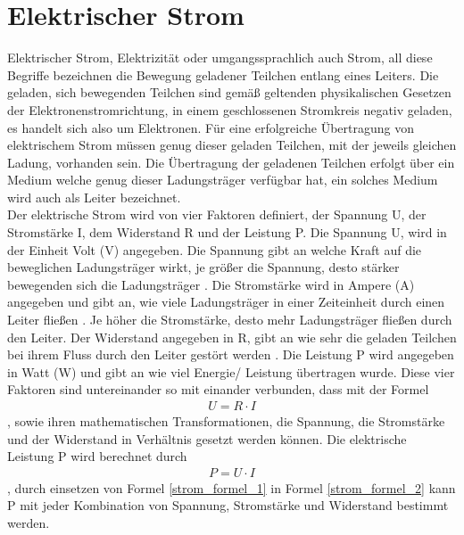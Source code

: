 \section{Elektrischer Strom}
Elektrischer Strom, Elektrizität oder umgangssprachlich auch Strom, all diese Begriffe bezeichnen die Bewegung geladener Teilchen entlang eines Leiters. Die geladen, sich bewegenden Teilchen sind gemäß geltenden physikalischen Gesetzen der Elektronenstromrichtung, in einem geschlossenen Stromkreis negativ geladen, es handelt sich also um Elektronen. Für eine erfolgreiche Übertragung von elektrischem Strom müssen genug dieser geladen Teilchen, mit der jeweils gleichen Ladung, vorhanden sein. Die Übertragung der geladenen Teilchen erfolgt über ein Medium welche genug dieser Ladungsträger verfügbar hat, ein solches Medium wird auch als Leiter bezeichnet.\\
Der elektrische Strom wird von vier Faktoren definiert, der Spannung U, der Stromstärke I, dem Widerstand R und der Leistung P. Die Spannung U, wird in der Einheit Volt (V) angegeben. Die Spannung gibt an welche Kraft auf die beweglichen Ladungsträger wirkt, je größer die Spannung, desto stärker bewegenden sich die Ladungsträger \cite{spannung_1}. Die Stromstärke wird in Ampere (A) angegeben und gibt an, wie viele Ladungsträger in einer Zeiteinheit durch einen Leiter fließen \cite{stromstaerke_1}. Je höher die Stromstärke, desto mehr Ladungsträger fließen durch den Leiter. Der Widerstand angegeben in R, gibt an wie sehr die geladen Teilchen bei ihrem Fluss durch den Leiter gestört werden \cite{widerstand_1}. Die Leistung P wird angegeben in Watt (W) und gibt an wie viel Energie/ Leistung übertragen wurde. Diese vier Faktoren sind untereinander so mit einander verbunden, dass mit der Formel 
\begin{align}
	U  =  R \cdot I
	\label{strom_formel_1}
\end{align}
, sowie ihren mathematischen Transformationen, die Spannung, die Stromstärke und der Widerstand in Verhältnis gesetzt werden können. Die elektrische Leistung P wird berechnet durch
\begin{align}
	P = U \cdot I
	\label{strom_formel_2}
\end{align}
, durch einsetzen von Formel \ref{strom_formel_1} in Formel \ref{strom_formel_2} kann P mit jeder Kombination von Spannung, Stromstärke und Widerstand bestimmt werden.\\
